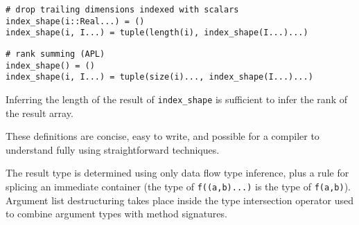 \begin{singlespace}
\begin{verbatim}
# drop trailing dimensions indexed with scalars
index_shape(i::Real...) = ()
index_shape(i, I...) = tuple(length(i), index_shape(I...)...)
\end{verbatim}
\end{singlespace}

\begin{singlespace}
\begin{verbatim}
# rank summing (APL)
index_shape() = ()
index_shape(i, I...) = tuple(size(i)..., index_shape(I...)...)
\end{verbatim}
\end{singlespace}

Inferring the length of the result of \texttt{index\_shape} is sufficient
to infer the rank of the result array.

These definitions are concise, easy to write, and possible for a
compiler to understand fully using straightforward techniques.




The result type is determined using only data flow type inference, plus a
rule for splicing an immediate container (the type of \texttt{f((a,b)...)} is
the type of \texttt{f(a,b)}). Argument list destructuring takes place inside
the type intersection operator used to combine argument types with method
signatures.

